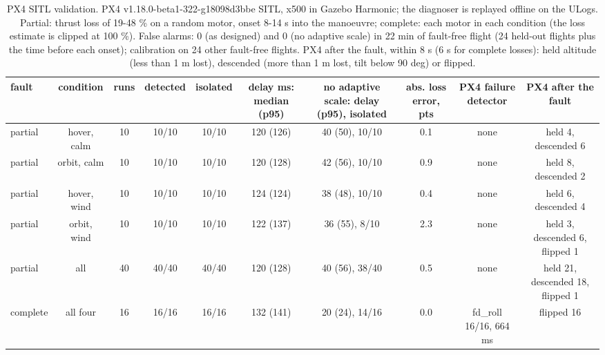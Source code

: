 \begin{table}[t]
\centering
\caption{PX4 SITL validation. PX4 v1.18.0-beta1-322-g18098d3bbe SITL, x500 in Gazebo Harmonic; the diagnoser is replayed offline on the ULogs. Partial: thrust loss of 19-48 \% on a random motor, onset 8-14 s into the manoeuvre; complete: each motor in each condition (the loss estimate is clipped at 100 \%). False alarms: 0 (as designed) and 0 (no adaptive scale) in 22 min of fault-free flight (24 held-out flights plus the time before each onset); calibration on 24 other fault-free flights. PX4 after the fault, within 8 s (6 s for complete losses): held altitude (less than 1 m lost), descended (more than 1 m lost, tilt below 90 deg) or flipped.}
\label{tab:sitl}
\footnotesize
\setlength{\tabcolsep}{3pt}
\begin{adjustbox}{max width=\linewidth}
\begin{tabular}{lccccccccc}
\toprule
fault & condition & runs & detected & isolated & delay ms: median (p95) & no adaptive scale: delay (p95), isolated & abs. loss error, pts & PX4 failure detector & PX4 after the fault \\
\midrule
partial & hover, calm & 10 & 10/10 & 10/10 & 120 (126) & 40 (50), 10/10 & 0.1 & none & held 4, descended 6 \\
partial & orbit, calm & 10 & 10/10 & 10/10 & 120 (128) & 42 (56), 10/10 & 0.9 & none & held 8, descended 2 \\
partial & hover, wind & 10 & 10/10 & 10/10 & 124 (124) & 38 (48), 10/10 & 0.4 & none & held 6, descended 4 \\
partial & orbit, wind & 10 & 10/10 & 10/10 & 122 (137) & 36 (55), 8/10 & 2.3 & none & held 3, descended 6, flipped 1 \\
partial & all & 40 & 40/40 & 40/40 & 120 (128) & 40 (56), 38/40 & 0.5 & none & held 21, descended 18, flipped 1 \\
complete & all four & 16 & 16/16 & 16/16 & 132 (141) & 20 (24), 14/16 & 0.0 & fd\_roll 16/16, 664 ms & flipped 16 \\
\bottomrule
\end{tabular}
\end{adjustbox}
\end{table}
